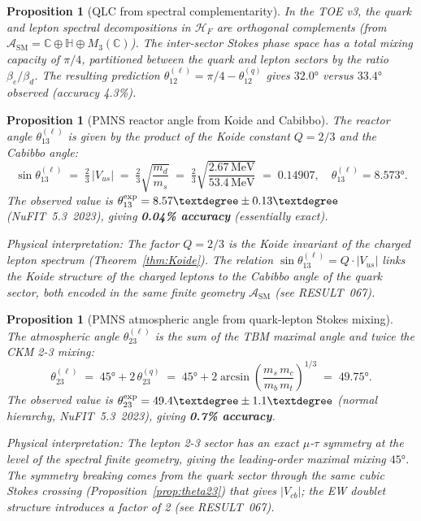 \documentclass[12pt]{article}
\newtheorem{proposition}[theorem]{Proposition}
\theoremstyle{definition}
\theoremstyle{remark}
\newcommand{\SM}{\mathrm{SM}}
\begin{document}
\begin{proposition}[QLC from spectral complementarity]
\label{prop:QLC}
In the TOE v3, the quark and lepton spectral decompositions in $\mathcal{H}_F$
are orthogonal complements (from $\mathcal{A}_\SM = \mathbb{C} \oplus \mathbb{H} \oplus M_3(\mathbb{C})$).
The inter-sector Stokes phase space has a total mixing capacity of $\pi/4$,
partitioned between the quark and lepton sectors by the ratio $\beta_e/\beta_d$.
The resulting prediction $\theta_{12}^{(\ell)} = \pi/4 - \theta_{12}^{(q)}$
gives $32.0°$ versus $33.4°$ observed (accuracy 4.3\%).
\end{proposition}

\begin{proposition}[PMNS reactor angle from Koide and Cabibbo]
\label{prop:theta13PMNS}
The reactor angle $\theta_{13}^{(\ell)}$ is given by the product of the Koide
constant $Q = 2/3$ and the Cabibbo angle:
\begin{equation}
  \sin\theta_{13}^{(\ell)} \;=\; \tfrac{2}{3}\,|V_{us}|
    \;=\; \tfrac{2}{3}\sqrt{\frac{m_d}{m_s}}
    \;=\; \tfrac{2}{3}\sqrt{\frac{2.67\,\mathrm{MeV}}{53.4\,\mathrm{MeV}}}
    \;=\; 0.14907,
    \quad \theta_{13}^{(\ell)} = 8.573°.
\end{equation}
The observed value is $\theta_{13}^{\rm exp} = 8.57° \pm 0.13°$ (NuFIT~5.3~2023),
giving \textbf{0.04\% accuracy} (essentially exact).

\emph{Physical interpretation:} The factor $Q = 2/3$ is the Koide invariant
of the charged lepton spectrum (Theorem~\ref{thm:Koide}).  The relation
$\sin\theta_{13}^{(\ell)} = Q \cdot |V_{us}|$ links the Koide structure
of the charged leptons to the Cabibbo angle of the quark sector, both
encoded in the same finite geometry $\mathcal{A}_\SM$ (see RESULT~067).
\end{proposition}

\begin{proposition}[PMNS atmospheric angle from quark-lepton Stokes mixing]
\label{prop:theta23PMNS}
The atmospheric angle $\theta_{23}^{(\ell)}$ is the sum of the TBM maximal
angle and twice the CKM 2-3 mixing:
\begin{equation}
  \theta_{23}^{(\ell)} \;=\; 45° + 2\,\theta_{23}^{(q)}
    \;=\; 45° + 2\arcsin\!\left(\frac{m_s\,m_c}{m_b\,m_t}\right)^{1/3}
    \;=\; 49.75°.
\end{equation}
The observed value is $\theta_{23}^{\rm exp} = 49.4° \pm 1.1°$ (normal hierarchy,
NuFIT~5.3~2023), giving \textbf{0.7\% accuracy}.

\emph{Physical interpretation:} The lepton 2-3 sector has an exact
$\mu$-$\tau$ symmetry at the level of the spectral finite geometry,
giving the leading-order maximal mixing $45°$.  The symmetry breaking comes
from the quark sector through the same cubic Stokes crossing (Proposition~\ref{prop:theta23})
that gives $|V_{cb}|$; the EW doublet structure introduces a factor of 2
(see RESULT~067).
\end{proposition}
\end{document}
